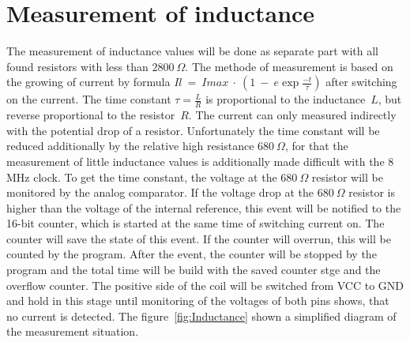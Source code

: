 \section{Measurement of inductance}
The measurement of inductance values will be done as separate part with all found resistors with
less than \(2800~\Omega\).
The methode of measurement is based on the growing of current by formula \(Il~=~Imax~\cdot~(1~-~e\exp{\frac{-t}{\tau}})\) 
after switching on the current.
The time constant \(\tau = \frac{L}{R}\) is proportional to the inductance~\(L\), but reverse proportional to the
resistor~\(R\). 
The current can only measured indirectly with the potential drop of a resistor.
Unfortunately the time constant will be reduced additionally by the relative high resistance \(680~\Omega\),
for that the measurement of little inductance values is additionally made difficult with the 8 MHz clock.
To get the time constant, the voltage at the \(680~\Omega\) resistor will be monitored by the analog
comparator.
If the voltage drop at the \(680~\Omega\) resistor is higher than the voltage of the internal reference, this
event will be notified to the 16-bit counter, which is started at the same time of switching current on.
The counter will save the state of this event.
If the counter will overrun, this will be counted by the program.
After the event, the counter will be stopped by the program and the total time will be build with the saved
counter stge and the overflow counter.
The positive side of the coil will be switched from VCC to GND and hold in this stage until  monitoring 
of the voltages of both pins shows, that no current is detected.
The figure~\ref{fig:Inductance} shown a simplified diagram of the measurement situation.

